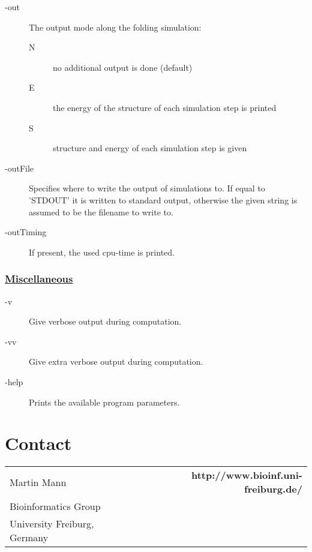 \documentclass{article}
\begin{document}
\begin{description}
  \item[-out] The output mode along the folding simulation:
  \begin{description}
    \item[N] no additional output is done (default)
    \item[E] the energy of the structure of each simulation step is printed
    \item[S] structure and energy of each simulation step is given
  \end{description}
  \item[-outFile] Specifies where to write the output of simulations to. 
  		If equal to 'STDOUT' it is written to standard output, otherwise the 
  		given string is assumed to be the filename to write to.
  \item[-outTiming] If present, the used cpu-time is printed.
\end{description}


\subsubsection*{\underline{ Miscellaneous }}

\begin{description}
	\item[-v] Give verbose output during computation.
	\item[-vv] Give extra verbose output during computation.
	\item[-help] Prints the available program parameters.
\end{description}


\section{Contact}

\begin{tabular}{lcr}
	Martin Mann  && \bfseries http://www.bioinf.uni-freiburg.de/\\
	Bioinformatics Group\\
	University Freiburg, Germany \\
\end{tabular}
\end{document}
